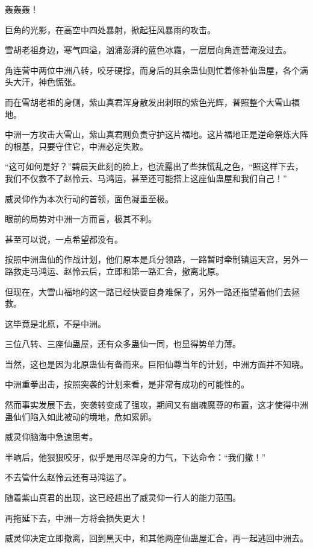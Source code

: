 
\begin{this_body}



轰轰轰！

巨角的光影，在高空中四处暴射，掀起狂风暴雨的攻击。

雪胡老祖身边，寒气四溢，汹涌澎湃的蓝色冰霜，一层层向角连营淹没过去。

角连营中两位中洲八转，咬牙硬撑，而身后的其余蛊仙则忙着修补仙蛊屋，各个满头大汗，神色慌张。

而在雪胡老祖的身侧，紫山真君浑身散发出刺眼的紫色光辉，普照整个大雪山福地。

中洲一方攻击大雪山，紫山真君则负责守护这片福地。这片福地正是逆命祭炼大阵的根基，只要守住它，中洲必定失败。

“这可如何是好？”碧晨天此刻的脸上，也流露出了些抹慌乱之色，“照这样下去，我们不仅救不了赵怜云、马鸿运，甚至还可能搭上这座仙蛊屋和我们自己！”

威灵仰作为本次行动的首领，面色凝重至极。

眼前的局势对中洲一方而言，极其不利。

甚至可以说，一点希望都没有。

按照中洲蛊仙的作战计划，他们原本是兵分领路，一路暂时牵制镇运天宫，另外一路救走马鸿运、赵怜云后，立即和第一路汇合，撤离北原。

但现在，大雪山福地的这一路已经快要自身难保了，另外一路还指望着他们去拯救。

这毕竟是北原，不是中洲。

三位八转、三座仙蛊屋，还有众多蛊仙一同，也显得势单力薄。

当然，这也是因为北原蛊仙有备而来。巨阳仙尊当年的计划，中洲方面并不知晓。

中洲重拳出击，按照突袭的计划来看，是非常有成功的可能性的。

然而事实发展下去，突袭转变成了强攻，期间又有幽魂魔尊的布置，这才使得中洲蛊仙们陷入如此被动的境地，危如累卵。

威灵仰脑海中急速思考。

半晌后，他狠狠咬牙，似乎是用尽浑身的力气，下达命令：“我们撤！”

不去管什么赵怜云还有马鸿运了。

随着紫山真君的出现，这已经超出了威灵仰一行人的能力范围。

再拖延下去，中洲一方将会损失更大！

威灵仰决定立即撤离，回到黑天中，和其他两座仙蛊屋汇合，再一起逃回中洲去。


\end{this_body}
